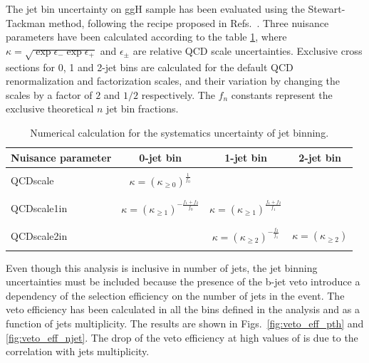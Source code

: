 The jet bin uncertainty on ggH sample has been evaluated using the Stewart-Tackman method, following the recipe proposed in Refs.~\cite{Stewart:2011cf,Heinemeyer:2013tqa}.
Three nuisance parameters have been calculated according to the table \ref{table:jet_binning_theory}, where $\kappa = \sqrt{\exp{\epsilon_{-}} \exp{\epsilon_{+}}}$ and $\epsilon_{\pm}$ are relative QCD scale uncertainties. Exclusive cross sections for 0, 1 and 2-jet bins are calculated for the default QCD renormalization and factorization scales, and their variation by changing the scales by a factor of $2$ and $1/2$ respectively. The $f_n$ constants represent the exclusive theoretical $n$ jet bin fractions.

\begin{table}[h]
\caption{Numerical calculation for the systematics uncertainty of jet binning.}
\label{table:jet_binning_theory}
\begin{center}
\begin{tabular}{|l|c|c|c|}
\hline
Nuisance parameter & 0-jet bin                                              & 1-jet bin                                            & 2-jet bin \\ 
\hline
&&& \\
QCDscale           & $\kappa = (\kappa_{\ge 0})^{\frac{1}{f_0}} $           &                                                      & \\ 
&&&\\\hline
&&&\\
QCDscale1in        & $\kappa = (\kappa_{\ge 1})^{- \frac{f_1 + f_2}{f_0}} $ & $\kappa = (\kappa_{\ge 1})^{\frac{f_1 + f_2}{f_1}} $ & \\ 
&&&\\ \hline
&&&\\
QCDscale2in        &                                                        & $\kappa = (\kappa_{\ge 2})^{- \frac{f_2}{f_1}} $     & $\kappa = (\kappa_{\ge 2})$ \\ 
&&&\\\hline

\end{tabular}
\end{center}
\end{table}

Even though this analysis is inclusive in number of jets, the jet binning uncertainties must be included because the presence of the b-jet veto introduce a dependency of the selection efficiency on the number of jets in the event. The veto efficiency has been calculated in all the \pth bins defined in the analysis and as a function of jets multiplicity. The results are shown in Figs.~\ref{fig:veto_eff_pth} and \ref{fig:veto_eff_njet}. The drop of the veto efficiency at high values of \pth is due to the correlation with jets multiplicity.

